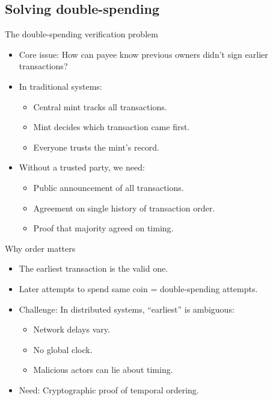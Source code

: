 \documentclass[aspectratio=169, lualatex, handout]{beamer}
\begin{document}
\subsection{Solving double-spending}

\begin{frame}{The double-spending verification problem}
	\begin{itemize}
		\item Core issue: How can payee know previous owners didn't sign earlier transactions?
		\item In traditional systems:
		      \begin{itemize}
			      \item Central mint tracks all transactions.
			      \item Mint decides which transaction came first.
			      \item Everyone trusts the mint's record.
		      \end{itemize}
		\item Without a trusted party, we need:
		      \begin{itemize}
			      \item Public announcement of all transactions.
			      \item Agreement on single history of transaction order.
			      \item Proof that majority agreed on timing.
		      \end{itemize}
	\end{itemize}
\end{frame}

\begin{frame}{Why order matters}
	\begin{itemize}
		\item The earliest transaction is the valid one.
		\item Later attempts to spend same coin = double-spending attempts.
		\item Challenge: In distributed systems, ``earliest'' is ambiguous:
		      \begin{itemize}
			      \item Network delays vary.
			      \item No global clock.
			      \item Malicious actors can lie about timing.
		      \end{itemize}
		\item Need: Cryptographic proof of temporal ordering.
	\end{itemize}
\end{frame}
\end{document}
